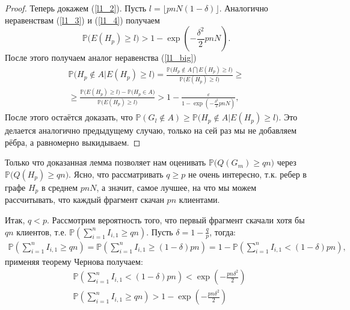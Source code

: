 \documentclass[10pt]{article}
\newcommand{\PRob}{\mathbb P}
\newcommand{\geqs}{\geqslant}
\newcommand{\eps}{\varepsilon}
\theoremstyle{named}
\begin{document}
\begin{proof}
Теперь докажем (\ref{l1_2}). Пусть $l = \lfloor pnN(1-\delta) \rfloor$. Аналогично неравенствам (\ref{l1_3}) и (\ref{l1_4}) получаем
\begin{equation} \label{l1_5}
\PRob\big( E(H_p) \geqs l \big) > 1 - \exp\left(-\frac{\delta^2}{2}pnN\right).
\end{equation}
После этого получаем аналог неравенства (\ref{l1_big})
\begin{equation}\label{l1_big2}
\begin{aligned}
	\PRob\Big( H_p \not\in A \big| E(H_p) \geqs l \Big)
=
	\frac{
		\PRob\Big( H_p \not\in A \bigcap E(H_p) \geqs l \Big)
	}{
		\PRob\big(E(H_p) \geqs l \big)
	} 
\geqs
\\
\geqs
	\frac{
		\PRob\big(E(H_p) \geqs l \big) 
			-
		\PRob\big(H_p \in A \big)
	}{
		\PRob\big(E(H_p) \geqs l\big)
	}
>
	1
		-
	\frac{\eps}{
		1 - \exp\left(-\frac{\delta^2}{2}pnN\right)
	},
\end{aligned}\end{equation}
После этого остаётся доказать, что $\PRob(G_l \not\in A) \geqs \PRob\Big( H_p \not\in A \big| E(H_p) \geqs l \Big)$.
Это делается аналогично предыдущему случаю, только на сей раз мы не добавляем рёбра, а равномерно выкидываем.
\end{proof}

\bigskip

Только что доказанная лемма позволяет нам оценивать $\PRob\big(Q(G_m) \geqs qn\big)$ через $\PRob\big(Q(H_p) \geqs q n\big)$.
Ясно, что рассматривать $q \geqs p$ не очень интересно, т.к. ребер в графе $H_p$ в среднем $pnN$, 
а значит, самое лучшее, на что мы можем рассчитывать, что каждый фрагмент скачан $pn$ клиентами.

Итак, $q < p$. Рассмотрим вероятность того, что первый фрагмент скачали хотя бы $qn$ клиентов, 
т.е. $\PRob\left(\sum\limits_{i=1}^n I_{i,1} \geqs qn\right)$. Пусть $\delta = 1 - \frac{q}{p}$, тогда:
\begin{align*}
\PRob\left(\sum_{i=1}^n I_{i,1} \geqs qn\right) = \PRob\left(\sum_{i=1}^n I_{i,1} \geqs (1 - \delta) pn\right) 
= 1 - \PRob\left(\sum_{i=1}^n I_{i,1} < (1 - \delta) pn\right),
\end{align*}
применяя теорему Чернова получаем:
\begin{align}
&\PRob\left(\sum_{i=1}^n I_{i,1} < (1 - \delta) pn\right) < \exp\left(- \frac{pn \delta^2}{2} \right)
\\
&\PRob\left(\sum_{i=1}^n I_{i,1} \geqs qn\right) > 1 - \exp\left(- \frac{pn \delta^2}{2} \right)
\end{align}
\end{document}
